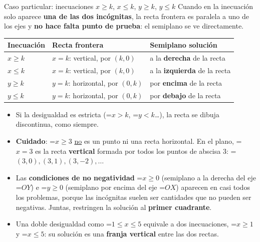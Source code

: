 \documentclass[11pt,a4paper]{article}
\newcommand{\lt}{<}\newcommand{\gt}{>}
\newcommand{\fmm}[1]{\setbox0=\hbox{$#1$}\ifdim\wd0>\linewidth\fmdisp{#1}\else\mbox{\box0}\fi}
\newcommand{\fmdisp}[1]{\[\setbox2=\hbox{$\displaystyle #1$}\ifdim\wd2>\linewidth\resizebox{\linewidth}{!}{\box2}\else\box2\fi\]}
\begin{document}
\begin{fmprop}{Caso particular: inecuaciones $x\geq k$, $x\leq k$, $y\geq k$, $y\leq k$}
Cuando en la inecuación solo aparece \textbf{una de las dos incógnitas}, la recta frontera es paralela a uno de los ejes y \textbf{no hace falta punto de prueba}: el semiplano se ve directamente.

\begin{center}\renewcommand{\arraystretch}{1.5}\small\begin{tabularx}{\linewidth}{>{\raggedright\arraybackslash}p{3.2cm}>{\raggedright\arraybackslash}X>{\raggedright\arraybackslash}X}\toprule
\textbf{Inecuación} & \textbf{Recta frontera} & \textbf{Semiplano solución}\\\midrule
$x\geq k$ & $x=k$: vertical, por $(k,0)$ & a la \textbf{derecha} de la recta\\[3pt]
$x\leq k$ & $x=k$: vertical, por $(k,0)$ & a la \textbf{izquierda} de la recta\\[3pt]
$y\geq k$ & $y=k$: horizontal, por $(0,k)$ & por \textbf{encima} de la recta\\[3pt]
$y\leq k$ & $y=k$: horizontal, por $(0,k)$ & por \textbf{debajo} de la recta\\[3pt]
\bottomrule\end{tabularx}\end{center}

\begin{itemize}
\item Si la desigualdad es estricta (\fmm{x\gt k}, \fmm{y\lt k}\dots{}), la recta se dibuja discontinua, como siempre.
\item \textbf{Cuidado}: \fmm{x\geq3} \underline{no} es un punto ni una recta horizontal. En el plano, \fmm{x=3} es la recta \textbf{vertical} formada por todos los puntos de abscisa 3: \fmm{(3,0),(3,1),(3,-2),\dots}
\item Las \textbf{condiciones de no negatividad} \fmm{x\geq0} (semiplano a la derecha del eje \fmm{OY}) e \fmm{y\geq0} (semiplano por encima del eje \fmm{OX}) aparecen en casi todos los problemas, porque las incógnitas suelen ser cantidades que no pueden ser negativas. Juntas, restringen la solución al \textbf{primer cuadrante}.
\item Una doble desigualdad como \fmm{1\leq x\leq5} equivale a dos inecuaciones, \fmm{x\geq1} y \fmm{x\leq5}: su solución es una \textbf{franja vertical} entre las dos rectas.
\end{itemize}
\end{fmprop}
\end{document}
